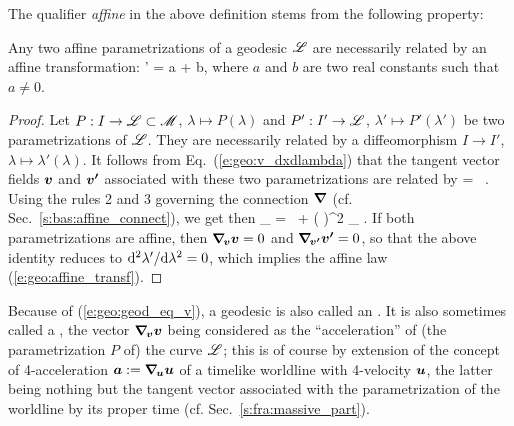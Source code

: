 The qualifier \emph{affine} in the above definition stems from the following
property:
\begin{greybox}
Any two affine parametrizations of a geodesic $\mathscr{L}$ are necessarily
related by an affine transformation:
\be \label{e:geo:affine_transf}
    \lambda' = a \lambda + b,
\ee
where $a$ and $b$ are two real constants such that $a\not = 0$.
\end{greybox}
\begin{proof}
Let $P: I \to  \mathscr{L}\subset\mathscr{M}$, $\lambda\mapsto P(\lambda)$ and
$P': I'\to \mathscr{L}$,
$\lambda'\mapsto P'(\lambda')$ be two
parametrizations of $\mathscr{L}$. They are necessarily related by a
diffeomorphism $I\to I'$, $\lambda \mapsto \lambda'(\lambda)$. It follows
from Eq.~(\ref{e:geo:v_dxdlambda}) that the tangent vector fields $\bm{v}$ and $\bm{v'}$
associated with these two parametrizations are related by
\be  \label{e:geo:change_tangent_vector}
     =  \,  .
\ee
Using the rules 2 and 3 governing the connection $\bm{\nabla}$ (cf. Sec.~\ref{s:bas:affine_connect}),
we get then
\be \label{e:geo:acc_v_acc_vp}
    \wnab_{\!} =  \, 
    + \left(  \right)^2 \wnab_{\!} .
\ee
If both parametrizations are affine, then $\bm{\nabla}_{\!\bm{v}}\bm{v} = 0$ and
$\bm{\nabla}_{\!\bm{v'}}\bm{v'} = 0$, so that the above identity reduces to
${\mathrm{d}^2\lambda'}/{\mathrm{d}\lambda^2} = 0$, which implies
the affine law (\ref{e:geo:affine_transf}).
\end{proof}

\begin{remark}
Because of (\ref{e:geo:geod_eq_v}), a geodesic is also called
an . It is also sometimes called
a , the
vector $\bm{\nabla}_{\!\bm{v}}\bm{v}$ being considered as the
``acceleration'' of (the parametrization $P$ of) the
curve $\mathscr{L}$; this is of course by extension of the concept of
4-acceleration $\bm{a} := \bm{\nabla}_{\!\bm{u}}\bm{u}$ of a timelike worldline
with 4-velocity $\bm{u}$, the latter being nothing but the tangent vector associated with
the parametrization of the worldline by its proper time (cf. Sec.~\ref{s:fra:massive_part}).
\end{remark}

